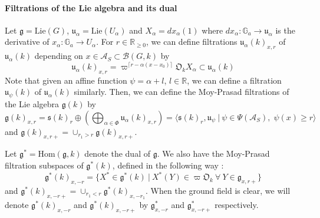\documentclass[11 pt]{article}
\numberwithin{equation}{subsection}
\theoremstyle{definition}
\theoremstyle{remark}
\theoremstyle{conjecture}
\newcommand{\fg}{\mathfrak g}
\newcommand{\Lie}{\mathrm{Lie}}
\newcommand{\Hom}{\mathrm{Hom}}
\newcommand{\R}{\mathbb R}
\newcommand{\A}{\mathcal A}
\newcommand{\G}{\mathbb G}
\newcommand{\mf}{\mathfrak}
\newcommand{\B}{\mathcal{B}}
\begin{document}
\paragraph{Filtrations of the Lie algebra and its dual}
Let $\fg = \Lie(G)$, $\mf u_\alpha = \Lie (U_\alpha) $ and $X_\alpha = dx_\alpha(1)$ where $dx_\alpha:\G_a\rightarrow \mf u_\alpha$ is the derivative of $x_\alpha:\G_a\rightarrow U_\alpha $. For $r \in \R_{\geq 0}$, we can define 
filtrations $\mf u_\alpha(k)_{x,r}$ of $\mf u_\alpha(k)$ depending on $x \in \A_S\subset \B(G,k)$ by 
\begin{equation*}
    \mf u_\alpha(k)_{x,r}= \varpi^{\lceil r-\alpha(x-x_0)\rceil} \mf O_k X_\alpha \subset \mf u_\alpha(k)
\end{equation*}
Note that given an affine function $\psi=\alpha +l$, $l \in \R$, we can define a filtration $\mf u_\psi(k)$ of $\mf u_\alpha(k)$ similarly. Then, we can define the Moy-Prasad filtrations of the Lie algebra $\fg(k)$ by 
\begin{equation*}
    \fg(k)_{x,r}= \mf s(k)_r\oplus \left(\bigoplus_{\alpha \in \Phi}\mf u_\alpha(k)_{x,r} \right)= \langle \mf s(k)_r, \mf u_\psi \:|\: \psi \in \Psi(\A_S), \; \psi(x)\geq r\rangle
\end{equation*}
and $\fg(k)_{x,r+}=\cup_{r_1>r}\fg(k)_{x,r+}$. \par
Let $\fg^*=\Hom(\fg,k)$ denote the dual of $\fg$. We also have the Moy-Prasad filtration subspaces of $\fg^*(k)$, defined in the following way :
\begin{equation}
   \fg^*(k)_{x,-r}=\{ X^* \in \fg^*(k)\:|\: X^*(Y) \in \varpi \mf O_k\: \forall \:Y \in \fg_{x,r+}\}
\end{equation}
and $\fg^*(k)_{x,-r+}=\cup_{r_1<r}\fg^*(k)_{x,-r_1} $. When the ground field is clear, we will denote $\fg^*(k)_{x,-r}$ and $\fg^*(k)_{x,-r+}$ by $\fg^*_{x,-r}$ and $\fg^*_{x,-r+}$ respectively. 
\end{document}
